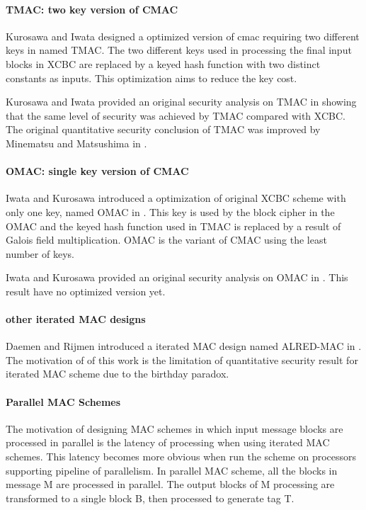 \documentclass{article}
\begin{document}
\paragraph{TMAC: two key version of CMAC}
Kurosawa and Iwata designed a optimized version of cmac requiring two different keys in \cite{tmac} named TMAC.  
The two different keys used in processing the final input blocks in XCBC are replaced by a keyed hash function with two distinct constants as inputs. This optimization aims to reduce the key cost. 

Kurosawa and Iwata provided an original security analysis on TMAC in \cite{tmac} showing that the same level of security was achieved by TMAC compared with XCBC. The original quantitative security conclusion of TMAC was improved by Minematsu and Matsushima in \cite{new}. 
\paragraph{OMAC: single key version of CMAC}
Iwata and Kurosawa introduced a optimization of original XCBC scheme with only one key, named OMAC in \cite{omac}. This key is used by the block cipher in the OMAC and the keyed hash function used in TMAC is replaced by a result of Galois field multiplication. OMAC is the variant of CMAC using the least number of keys. 

Iwata and Kurosawa provided an original security analysis on OMAC in \cite{omac}. This result have no optimized version yet.
\paragraph{other iterated MAC designs}
Daemen and Rijmen introduced a iterated MAC design named ALRED-MAC in \cite{alred}. The motivation of of this work is the limitation of quantitative security result for iterated MAC scheme due to the birthday paradox. 

\paragraph{Parallel MAC Schemes}
The motivation of designing MAC schemes in which input message blocks are processed in parallel is the latency of processing when using iterated MAC schemes. This latency becomes more obvious when run the scheme on processors supporting pipeline of parallelism. 
In parallel MAC scheme, all the blocks in message M are processed in parallel. The output blocks of M processing are transformed to a single block B, then processed to generate tag T. 
\end{document}
